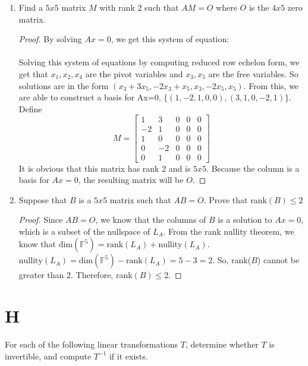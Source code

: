 \documentclass[11pt]{scrartcl}
\begin{document}
\begin{enumerate}[label=\alph*.]
	\item{
		Find a $5x5$ matrix $M$ with rank 2 such that $AM=O$ where $O$ is the $4x5$ zero matrix.
		\begin{proof}
			By solving $Ax=0$, we get this system of equation:\\
			\\
			Solving this system of equations by computing reduced row echelon form, 
			we get that $x_1, x_2, x_4$ are the pivot variables and $x_3, x_5$ are the 
			free variables. So solutions are in the form 
			$(x_3+3x_5,-2x_3+x_5, x_3, -2x_5,x_5)$. From this, we are able to 
			construct a basis for Ax=0, $\{(1,-2,1,0,0),(3,1,0,-2,1)\}$.
			Define   
			\[			
				M=
				\left[\begin{array}{ccccc}
				1 &3 & 0 & 0 &0 \\ 
				-2 &1 & 0 & 0 &0 \\ 
				1 &0 & 0 & 0 &0 \\ 
				0 &-2 & 0 & 0 &0 \\ 
				0 &1 & 0 & 0 &0 
				\end{array}\right]	
			\]
			It is obvious that this matrix has rank 2 and is $5x5$. Because the column is a basis for $Ax=0$, the resulting matrix will be $O$.
		\end{proof}
	}
	\item{
		Suppose that $B$ is a $5x5$ matrix such that $AB=O$. Prove that rank$(B) \leq 2$
		\begin{proof}
			Since $AB=O$, we know that the columns of $B$ is a solution to $Ax=0$, which is a subset of the nullspace of $L_A$.
			From the rank nullity theorem, we know that $\text{dim}(\mathbb{F}^5) = \text{rank}(L_A) + \text{nullity}(L_A)$.\\
			$\text{nullity}(L_A) = \text{dim}(\mathbb{F}^5) - \text{rank}(L_A) = 5 - 3 = 2$. So, rank($B$) cannot be greater than 2. 
			Therefore, rank$(B) \leq 2$.
		\end{proof}
	}
\end{enumerate}

\section{H} 
For each of the following linear transformations $T$, determine whether $T$ is invertible, and compute $T^{-1}$ if it exists.
\end{document}
